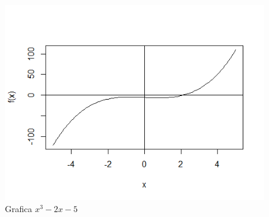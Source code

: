 \documentclass[12pt,a4paper]{article}
\begin{document}
\begin{figure}
	\centering                                         
	\includegraphics[scale = 1.0]{Ec3.png} 
	\caption{Grafica  $x^3-2x-5$}            
\end{figure}



\end{document}
